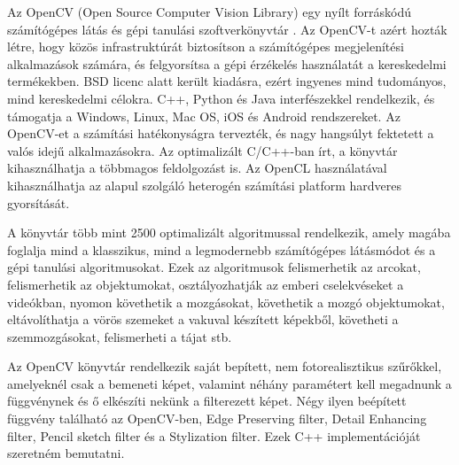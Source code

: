 


Az OpenCV (Open Source Computer Vision Library) egy nyílt forráskódú számítógépes látás és gépi tanulási szoftverkönyvtár \cite{opencv}. Az OpenCV-t azért hozták létre, hogy közös infrastruktúrát biztosítson a számítógépes megjelenítési alkalmazások számára, és felgyorsítsa a gépi érzékelés használatát a kereskedelmi termékekben. BSD licenc alatt került kiadásra, ezért ingyenes mind tudományos, mind kereskedelmi célokra. C++, Python és Java interfészekkel rendelkezik, és támogatja a Windows, Linux, Mac OS, iOS és Android rendszereket. Az OpenCV-et a számítási hatékonyságra tervezték, és nagy hangsúlyt fektetett a valós idejű alkalmazásokra. Az optimalizált C/C++-ban írt, a könyvtár kihasználhatja a többmagos feldolgozást is. Az OpenCL használatával kihasználhatja az alapul szolgáló heterogén számítási platform hardveres gyorsítását.

A könyvtár több mint 2500 optimalizált algoritmussal rendelkezik, amely magába foglalja mind a klasszikus, mind a legmodernebb számítógépes látásmódot és a gépi tanulási algoritmusokat. Ezek az algoritmusok felismerhetik az arcokat, felismerhetik az objektumokat, osztályozhatják az emberi cselekvéseket a videókban, nyomon követhetik a mozgásokat, követhetik a mozgó objektumokat, eltávolíthatja a vörös szemeket a vakuval készített képekből, követheti a szemmozgásokat, felismerheti a tájat stb. 



Az OpenCV könyvtár rendelkezik saját bepített, nem fotorealisztikus szűrőkkel, amelyeknél csak a bemeneti képet, valamint néhány paramétert kell megadnunk a függvénynek és ő elkészíti nekünk a filterezett képet. Négy ilyen beépített függvény található az OpenCV-ben, Edge Preserving filter, Detail Enhancing filter, Pencil sketch filter és a Stylization filter. Ezek C++ implementációját szeretném bemutatni.



